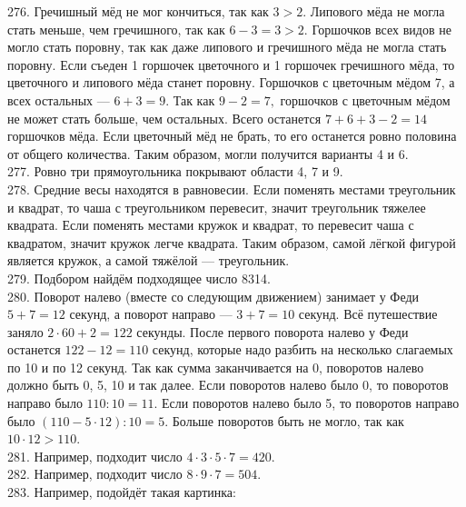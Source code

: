 \documentclass[12pt]{article}
\begin{document}
276. Гречишный мёд не мог кончиться, так как $3>2.$ Липового мёда не могла стать меньше, чем гречишного, так как $6-3=3>2.$ Горшочков всех видов не могло стать поровну, так как даже липового и гречишного мёда не могла стать поровну. Если съеден 1 горшочек цветочного и 1 горшочек гречишного мёда, то цветочного и липового мёда станет поровну. Горшочков с цветочным мёдом 7, а всех остальных --- $6+3=9.$ Так как $9-2=7,$ горшочков с цветочным мёдом не может стать больше, чем остальных. Всего останется $7+6+3-2=14$ горшочков мёда. Если цветочный мёд не брать, то его останется ровно половина от общего количества. Таким образом, могли получится варианты 4 и 6.\\
277. Ровно три прямоугольника покрывают области 4, 7 и 9.\\
278. Средние весы находятся в равновесии. Если поменять местами треугольник и квадрат, то чаша с треугольником перевесит, значит треугольник тяжелее квадрата. Если поменять местами кружок и квадрат, то перевесит чаша с квадратом, значит кружок легче квадрата. Таким образом, самой лёгкой фигурой является кружок, а самой тяжёлой --- треугольник.\\
279. Подбором найдём подходящее число 8314.\\
280. Поворот налево (вместе со следующим движением) занимает у Феди $5+7=12$ секунд, а поворот направо --- $3+7=10$ секунд. Всё путешествие заняло $2\cdot60+2=122$ секунды. После первого поворота налево у Феди останется $122-12=110$ секунд, которые надо разбить на несколько слагаемых по 10 и по 12 секунд. Так как сумма заканчивается на 0, поворотов налево должно быть 0, 5, 10 и так далее. Если поворотов налево было 0, то поворотов направо было $110:10=11.$ Если поворотов налево было 5, то поворотов направо было $(110-5\cdot12):10=5.$ Больше поворотов быть не могло, так как $10\cdot12>110.$\\
281. Например, подходит число $4\cdot3\cdot5\cdot7=420.$\\
282. Например, подходит число $8\cdot9\cdot7=504.$\\
283. Например, подойдёт такая картинка:
\begin{center}
\begin{figure}[ht!]
\end{figure}
\end{center}\newpage
\end{document}
